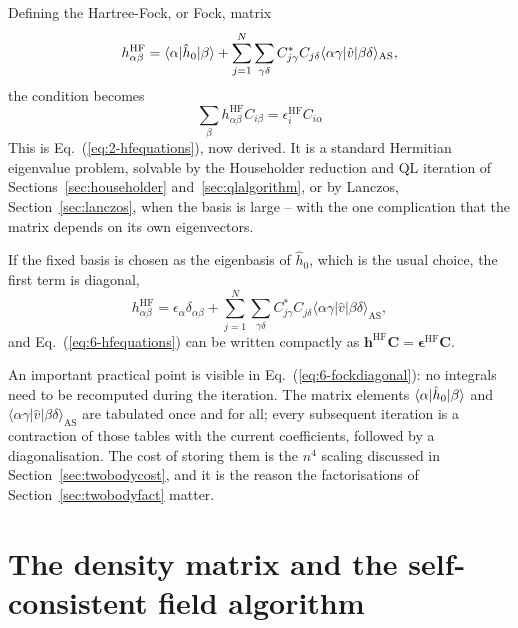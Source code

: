 Defining the Hartree-Fock, or Fock, matrix
\begin{equation}
  h^{\mathrm{HF}}_{\alpha\beta}
  = \langle \alpha | \hat{h}_0 | \beta \rangle
  + \sum_{j=1}^{N}\sum_{\gamma\delta}C^{*}_{j\gamma}C_{j\delta}
    \langle\alpha\gamma\vert\hat{v}\vert\beta\delta\rangle_{\mathrm{AS}},
  \label{eq:6-fockmatrix}
\end{equation}
the condition becomes
\begin{equation}
  \boxed{\;
  \sum_{\beta}h^{\mathrm{HF}}_{\alpha\beta}C_{i\beta}
    = \epsilon_i^{\mathrm{HF}}C_{i\alpha}
  \;}
  \label{eq:6-hfequations}
\end{equation}
This is Eq.~(\ref{eq:2-hfequations}), now derived.  It is a standard Hermitian
eigenvalue problem, solvable by the Householder reduction and QL iteration of
Sections~\ref{sec:householder} and~\ref{sec:qlalgorithm}, or by Lanczos,
Section~\ref{sec:lanczos}, when the basis is large -- with the one
complication that the matrix depends on its own eigenvectors.

If the fixed basis is chosen as the eigenbasis of $\hat{h}_0$, which is the
usual choice, the first term is diagonal,
\begin{equation}
  h^{\mathrm{HF}}_{\alpha\beta}
  = \epsilon_{\alpha}\delta_{\alpha\beta}
  + \sum_{j=1}^{N}\sum_{\gamma\delta}C^{*}_{j\gamma}C_{j\delta}
    \langle\alpha\gamma\vert\hat{v}\vert\beta\delta\rangle_{\mathrm{AS}},
  \label{eq:6-fockdiagonal}
\end{equation}
and Eq.~(\ref{eq:6-hfequations}) can be written compactly as
$\bm{h}^{\mathrm{HF}}\bm{C} = \bm{\epsilon}^{\mathrm{HF}}\bm{C}$.

An important practical point is visible in Eq.~(\ref{eq:6-fockdiagonal}): no
integrals need to be recomputed during the iteration.  The matrix elements
$\langle \alpha | \hat{h}_0 | \beta \rangle$ and
$\langle\alpha\gamma\vert\hat{v}\vert\beta\delta\rangle_{\mathrm{AS}}$ are
tabulated once and for all; every subsequent iteration is a contraction of
those tables with the current coefficients, followed by a diagonalisation.
The cost of storing them is the $n^4$ scaling discussed in
Section~\ref{sec:twobodycost}, and it is the reason the factorisations of
Section~\ref{sec:twobodyfact} matter.

\section{The density matrix and the self-consistent field algorithm}
\label{sec:scf}

